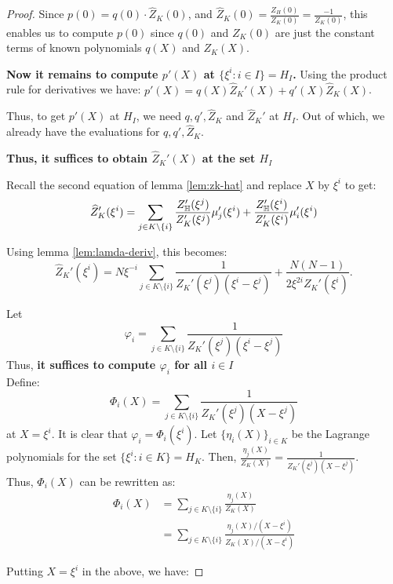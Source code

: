 \begin{proof}
    Since $p(0)=q(0)\cdot \hat{Z}_K(0)$, and
    $\hat{Z}_K(0)=\frac{Z_H(0)}{Z_K(0)}=\frac{-1}{Z_K(0)}$, this enables us to compute $p(0)$ since $q(0)$ and $Z_K(0)$ are just the constant terms of known polynomials $q(X)$ and $Z_K(X)$.

    \textbf{Now it remains to compute $p'(X)$ at $\{\xi^i:i \in I\}=H_I$.}
    Using the  product rule for derivatives we have: $p'(X)=q(X) \hat{Z}_K'(X)+q'(X) \hat{Z}_K(X)$.

    Thus, to get $p'(X)$ at $H_I$, we need $q, q', \hat{Z}_K$ and $\hat{Z}_K'$ at $H_I$. Out of which, we already have the evaluations for $q, q', \hat{Z}_K$.

    \textbf{Thus, it suffices to obtain
        $\hat{Z}_K'(X)$ at the set $H_I$}

    Recall the second equation of lemma \ref{lem:zk-hat} and replace $X$ by $\xi^i$ to get:
    $$  \widehat{Z}_K'(\xi^i) = \sum_{j\in K\setminus \{i\}} \frac{Z_{\mathbb{H}}'(\xi^j)}{Z_K'(\xi^j)}\mu_j'(\xi^i) + \frac{Z_{\mathbb{H}}'(\xi^i)}{Z_K'(\xi^i)}\mu_i'(\xi^i)$$

    Using lemma \ref{lem:lamda-deriv}, this becomes:
    $$ \widehat{Z}_K'(\xi^i)= N\xi^{-i}\sum_{j\in K\setminus \{i\}}\frac{1}{Z_K'(\xi^j)(\xi^i-\xi^j)} + \frac{N(N-1)}{2\xi^{2i}Z_K'(\xi^i)}.$$


    Let $$\varphi_i=\sum_{j\in K\setminus \{i\}}\frac{1}{Z_K'(\xi^j)(\xi^i-\xi^j)}$$
    Thus,\textbf{ it suffices to compute $\varphi_i$ for all $i \in I$}\\

    Define:
    $$ \Phi_i(X) = \sum_{j\in K\setminus \{i\}} \frac{1}{Z_K'(\xi^j)(X-\xi^j)} $$
    at $X=\xi^i$. It is clear that $\varphi_i=\Phi_i(\xi^i)$.
    Let $\{\eta_i(X)\}_{i\in K}$ be the Lagrange polynomials for the set $\{\xi^i:i\in K\}= H_K$.
    Then, $\frac{\eta_j(X)}{Z_K(X)}=\frac{1}{Z_K'(\xi^j)(X-\xi^j)}$.\\
    Thus, $\Phi_i(X)$ can be rewritten as:
    \begin{align*}
        \Phi_i(X)&=\sum_{j\in K\setminus \{i\}} \frac{\eta_j(X)}{Z_K(X)}\\
        &= \sum_{j\in K\setminus \{i\}} \frac{\eta_j(X)/(X-\xi^i)}{Z_K(X)/(X-\xi^i)}
    \end{align*}

    Putting $X=\xi^i$ in the above, we have:


\end{proof}
